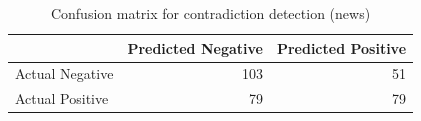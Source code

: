 \begin{table}
\caption{Confusion matrix for contradiction detection (news)}
\label{tab:confusion_matrix}
\begin{tabular}{lrr}
\toprule
 & Predicted Negative & Predicted Positive \\
\midrule
Actual Negative & 103 & 51 \\
Actual Positive & 79 & 79 \\
\bottomrule
\end{tabular}
\end{table}
